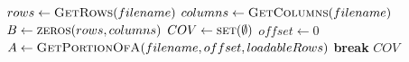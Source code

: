 \documentclass{beamer}
\begin{document}
\begin{frame}{}
    \begin{algorithmic}
            \State $rows \gets \Call{GetRows}{filename}$
            \State $columns \gets \Call{GetColumns}{filename}$
            \State $B \gets \Call{zeros}{rows, columns}$
            \State $COV \gets \Call{set}{\emptyset}$
            \State $offset \gets 0$
                \State $A \gets \Call{GetPortionOfA}{filename, offset, loadableRows}$
                    \State \textbf{break}
                \EndIf
                \State {}
            \EndWhile
            \State \Return $COV$
        \EndFunction
    \end{algorithmic}
\end{frame}

\end{document}
